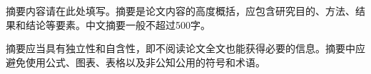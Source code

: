 
\begin{cnabstract}

摘要内容请在此处填写。摘要是论文内容的高度概括，应包含研究目的、方法、结果和结论等要素。中文摘要一般不超过500字。

摘要应当具有独立性和自含性，即不阅读论文全文也能获得必要的信息。摘要中应避免使用公式、图表、表格以及非公知公用的符号和术语。


\end{cnabstract}

